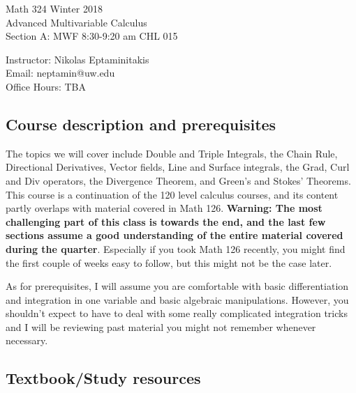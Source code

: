\documentclass[11pt]{article}
\begin{document}
 \noindent\LARGE Math 324 Winter 2018 \\
 \LARGE Advanced Multivariable Calculus \\
 \LARGE Section A: MWF 8:30-9:20 am	CHL 015  \\

\vspace{2mm}


\noindent\large Instructor: Nikolas Eptaminitakis\\
\large Email: neptamin@uw.edu \\
\large Office Hours: TBA
\vspace{1mm}

\subsection*{Course description and prerequisites}
 The topics we will cover include Double and Triple Integrals, the Chain Rule, Directional Derivatives, Vector fields, Line and Surface integrals, the Grad, Curl and Div operators, the Divergence Theorem, and Green's and Stokes' Theorems. This course is a continuation of the 120 level calculus courses, and its content partly overlaps with material covered in Math 126. \textbf{Warning: The most challenging part of this class is towards the end, and the last few sections assume a good understanding of the entire material covered during the quarter}. Especially if you took Math 126 recently, you might find the first couple of weeks easy to follow, but this might not be the case later.

	As for prerequisites, I will assume you are comfortable with basic differentiation and integration in one variable and basic algebraic manipulations. However, you shouldn't expect to have to deal with some really complicated integration tricks and I will be reviewing past material you might not remember whenever necessary.


\vspace{1mm}
\subsection*{Textbook/Study resources}
\end{document}
